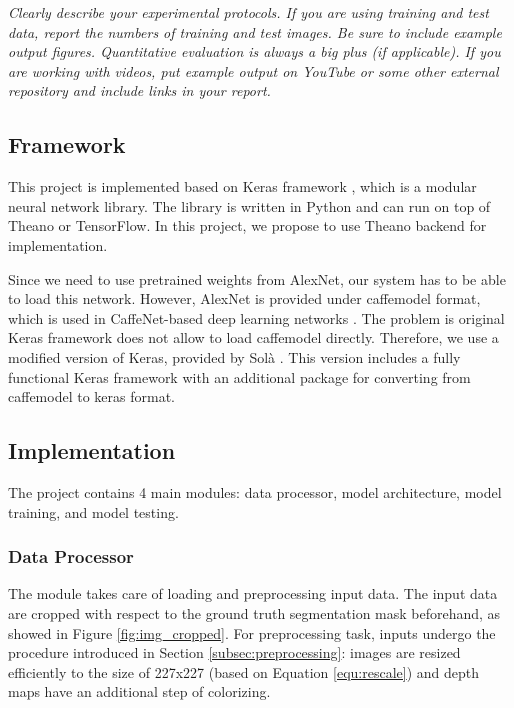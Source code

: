 
\textit{Clearly describe your experimental protocols. If you are using training and test data, report the numbers of training and test images. Be sure to include example output figures. Quantitative evaluation is always a big plus (if applicable). If you are working with videos, put example output on YouTube or some other external repository and include links in your report.}


\subsection{Framework}
This project is implemented based on Keras framework \cite{Chollet2015_keras}, which is a modular neural network library. The library is written in Python and can run on top of Theano or TensorFlow. In this project, we propose to use Theano backend \cite{theano2016} for implementation.

Since we need to use pretrained weights from AlexNet, our system has to be able to load this network. However, AlexNet is provided under caffemodel format, which is used in CaffeNet-based deep learning networks \cite{Jia2014_caffe}. The problem is original Keras framework does not allow to load caffemodel directly. Therefore, we use a modified version of Keras, provided by Sol\`{a} \cite{Sola2016}. This version includes a fully functional Keras framework with an additional package for converting from caffemodel to keras format.



\subsection{Implementation}
The project contains 4 main modules: data processor, model architecture, model training, and model testing.

\subsubsection{Data Processor}
The module takes care of loading and preprocessing input data. The input data are cropped with respect to the ground truth segmentation mask beforehand, as showed in Figure \ref{fig:img_cropped}. For preprocessing task, inputs undergo the procedure introduced in Section \ref{subsec:preprocessing}: images are resized efficiently to the size of 227x227 (based on Equation \ref{equ:rescale}) and depth maps have an additional step of colorizing. 

